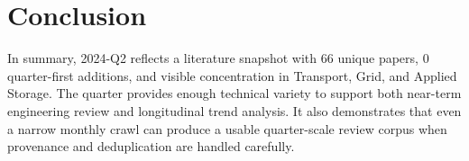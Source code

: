 \documentclass[conference]{IEEEtran}
\begin{document}
\section{Conclusion}
In summary, 2024-Q2 reflects a literature snapshot with 66 unique papers, 0 quarter-first additions, and visible concentration in Transport, Grid, and Applied Storage. The quarter provides enough technical variety to support both near-term engineering review and longitudinal trend analysis. It also demonstrates that even a narrow monthly crawl can produce a usable quarter-scale review corpus when provenance and deduplication are handled carefully.



\end{document}
